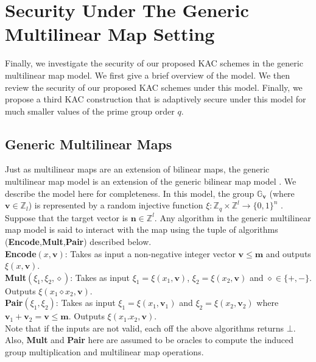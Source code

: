 \section{Security Under The Generic Multilinear Map Setting}
\label{sec:generic_security}

Finally, we investigate the security of our proposed KAC schemes in the generic multilinear map model. We first give a brief overview of the model. We then review the security of our proposed KAC schemes under this model. Finally, we propose a third KAC construction that is adaptively secure under this model for much smaller values of the prime group order $q$. 

\subsection{Generic Multilinear Maps}
\label{subsec:generic}

Just as multilinear maps are an extension of bilinear maps, the generic multilinear map model is an extension of the generic bilinear map model \cite{boneh2005hierarchical}. We describe the model here for completeness. In this model, the group $\mathbb{G}_{\mathbf{v}}$ (where $\mathbf{v}\in\mathbb{Z}_l$) is represented by a random injective function $\xi:\mathbb{Z}_q\times\mathbb{Z}^l\rightarrow\{0,1\}^n$ \cite{boneh2014low}. Suppose that the target vector is $\mathbf{n}\in\mathbb{Z}^l$. Any algorithm in the generic multilinear map model is said to interact with the map using the tuple of algorithms (\textbf{Encode},\textbf{Mult},\textbf{Pair}) described below.\\

\noindent\textbf{Encode}$(x,\mathbf{v})$: Takes as input a non-negative integer vector $\mathbf{v}\leq\mathbf{m}$ and outputs $\xi(x,\mathbf{v})$.\\

\noindent\textbf{Mult}$(\xi_1,\xi_2,\diamond)$: Takes as input $\xi_1=\xi(x_1,\mathbf{v})$, $\xi_2=\xi(x_2,\mathbf{v})$ and $\diamond\in\{+,-\}$. Outputs $\xi(x_1\diamond x_2,\mathbf{v})$.\\

\noindent\textbf{Pair}$(\xi_1,\xi_2)$: Takes as input $\xi_1=\xi(x_1,\mathbf{v}_1)$ and $\xi_2=\xi(x_2,\mathbf{v}_2)$ where $\mathbf{v}_1+\mathbf{v}_2=\mathbf{v}\leq\mathbf{m}$. Outputs $\xi(x_1.x_2,\mathbf{v})$.\\

\noindent Note that if the inputs are not valid, each off the above algorithms returns $\bot$. Also, \textbf{Mult} and \textbf{Pair} here are assumed to be oracles to compute the induced group multiplication and multilinear map operations. 

